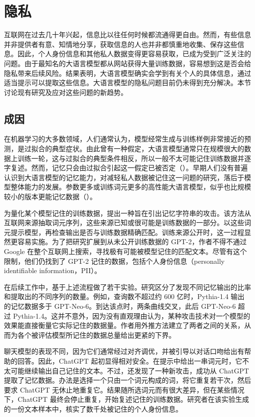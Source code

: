 \section{隐私}
\label{sec:ch06-privacy}
互联网在过去几十年兴起，信息比以往任何时候都流通得更自由。然而，有些信息并非提供者有意、知情地分享，获取信息的人也并非都慎重地收集、保存这些信息。因此，个人身份信息和其他私人数据变得更容易获取，已成为受到广泛关注的问题。由于最知名的大语言模型都从网站获得大量训练数据，容易想到这是否会给隐私带来后续风险。结果表明，大语言模型确实会学到有关个人的具体信息，通过适当提示可以提取这些信息。大语言模型的隐私问题目前仍未得到充分解决。本节讨论现有研究及应对这些问题的新趋势。

\subsection{成因}
在机器学习的大多数领域，人们通常认为，模型经常生成与训练样例非常接近的预测，是过拟合的典型症状。由此曾有一种假定，大语言模型通常只在规模很大的数据上训练一轮，这与过拟合的典型条件相反，所以一般不太可能记住训练数据并逐字复述。然而，记忆只会由过拟合引起这一假定已被否定（）。早期人们没有普遍认识到大语言模型的记忆能力，对减轻私人数据被记住这一问题的研究，落后于模型整体能力的发展。参数更多或训练词元更多的高性能大语言模型，似乎也比规模较小的版本更能记忆数据（）。

为量化某个模型记住的训练数据，提出一种旨在引出记忆字符串的攻击。该方法从互联网来源抽取词元序列，这些来源已知或很可能是训练数据的一部分。以这些词元提示模型，再检查输出是否与训练数据精确匹配。训练来源公开时，这一过程显然更容易实施。为了把研究扩展到从未公开训练数据的 GPT-2，作者不得不通过 Google 在整个互联网上搜索，寻找极有可能被模型记住的匹配文本。尽管有这个限制，他们仍找到了 GPT-2 记住的数据，包括个人身份信息（personally identifiable information，PII）。

在后续工作中，基于上述流程做了若干实验。研究区分了发现不同记忆输出的比率和提取出的不同序列的数量。例如，查询数不超过约 600 亿时，Pythia-1.4 输出的记忆数据多于 GPT-Neo-6。到达该点时，两条曲线交叉，此后 GPT-Neo-6 超过 Pythia-1.4。这并不意外，因为没有直观理由认为，某种攻击技术对一个模型的效果能直接衡量它实际记住的数据量。作者用外推方法建立了两者之间的关系，从而为各个被评估模型所记住的数据总量给出更紧的下界。

聊天模型的表现不同，因为它们通常经过对齐调优，并被引导以对话口吻给出有帮助的回答。因此，ChatGPT 起初显得相对安全。在提示中给出一串词元时，它不太可能继续输出自己记住的文本。不过，还发现了一种新攻击，成功从 ChatGPT 提取了记忆数据。办法是选择一个只由一个词元构成的词，将它重复若干次，然后要求 ChatGPT 无休止地重复它。结果随所选词元而有很大差异，但在某些情况下，ChatGPT 最终会停止重复，开始复述记住的训练数据。研究者在该实验生成的一份文本样本中，核实了数千处被记住的个人身份信息。

